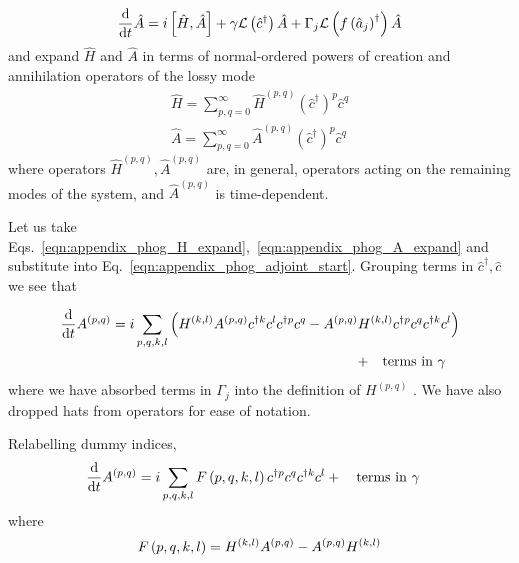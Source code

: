 \begin{equation}\label{eqn:appendix_phog_adjoint_start}
\frac{\mathrm{d}}{\mathrm{d}t} \hat{A} = i \left[ \hat{H}, \hat{A} \right] + \gamma \mathcal{L}\left(\hat{c}^\dagger \right) \hat{A} + \Gamma_j \mathcal{L} \left( f\left(\hat{a}_j\right)^\dagger\right) \hat{A}
\end{equation}
and expand $\hat{H}$ and $\hat{A}$ in terms of normal-ordered powers of creation and annihilation operators of the lossy mode
\begin{align}
\hat{H} = \sum_{p, q = 0}^{\infty} \hat{H}^{\left(p, q\right)} \left(\hat{c}^\dagger\right)^p \hat{c}^q \label{eqn:appendix_phog_H_expand}  \\
%
\hat{A} = \sum_{p, q = 0}^{\infty} \hat{A}^{\left(p, q\right)} \left(\hat{c}^\dagger \right)^p \hat{c}^q \label{eqn:appendix_phog_A_expand}
\end{align}
where operators $\hat{H}^{\left(p, q\right)}, \hat{A}^{\left(p, q\right)}$ are, in general, operators acting on the remaining modes of the system, and $\hat{A}^{\left(p, q\right)}$ is time-dependent.

Let us take Eqs.~\ref{eqn:appendix_phog_H_expand},~\ref{eqn:appendix_phog_A_expand} and substitute into Eq.~\ref{eqn:appendix_phog_adjoint_start}. Grouping terms in $\hat{c}^\dagger, \hat{c}$ we see that

\begin{align}
\ddt A^{\left(p, q\right)} = i \sum_{p, q, k, l} \left(H^{\left(k, l\right)} A^{\left(p, q\right)} c^{\dagger k} c^{l} c^{\dagger p} c^q - A^{\left(p, q\right)} H^{\left(k, l\right)} c^{\dagger p} c^q c^{\dagger k} c^l\right)& \notag \\
%
+ \qq{terms in $\gamma$}&
\end{align}
where we have absorbed terms in $\Gamma_j$ into the definition of $H^{\left(p, q\right)}$ . We have also dropped hats from operators for ease of notation.

Relabelling dummy indices,
\begin{equation}
\ddt A^{\left(p, q\right)} = i \sum_{p, q, k, l} F\left(p, q, k, l\right) c^{\dagger p} c^{q} c^{\dagger k} c^l + \qq{terms in $\gamma$}
\end{equation}
where
\begin{equation}
F\left(p, q, k, l\right) = H^{\left(k, l\right)} A^{\left(p, q\right)} - A^{\left(p, q\right)} H^{\left(k, l\right)} \notag
\end{equation}